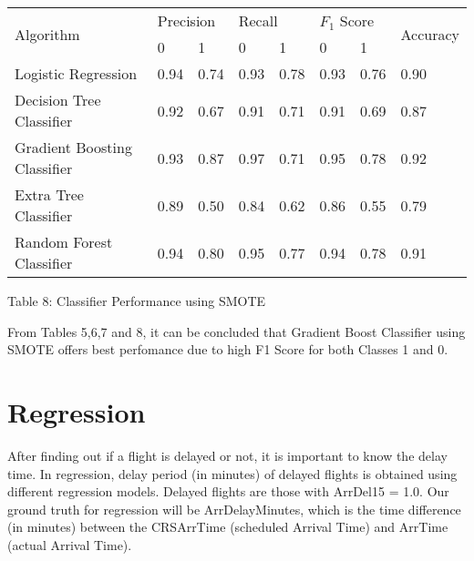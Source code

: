 \documentclass[12pt,letter-paper]{article}
\begin{document}
            \begin{table}[H]
        \begin{center}
            \begin{tabular}{|l|l|l|l|l|l|l|l|}
                \hline
                \multirow{2}{*}{Algorithm} & \multicolumn{2}{l|}{Precision} & \multicolumn{2}{l|}{Recall} & \multicolumn{2}{l|}{$F_1$ Score} & \multirow{2}{*}{Accuracy} \\ \cline{2-7}
                                   & 0              & 1             & 0            & 1            & 0             & 1             &                           \\ \hline
            Logistic Regression         & 0.94           & 0.74          & 0.93         & 0.78         & 0.93          & 0.76          & 0.90                     \\ \hline
            Decision Tree Classifier         & 0.92           & 0.67          & 0.91         & 0.71         & 0.91          & 0.69          & 0.87                      \\ \hline
            Gradient Boosting Classifier & 0.93           & 0.87          & 0.97         & 0.71         & 0.95          & 0.78          & 0.92                      \\ \hline
            Extra Tree Classifier       & 0.89           & 0.50          & 0.84         & 0.62         & 0.86          & 0.55          & 0.79                      \\ \hline
            Random Forest Classifier     & 0.94           & 0.80          & 0.95         & 0.77         & 0.94          & 0.78          & 0.91                      \\ \hline
            \end{tabular}
        \end{center}
        \begin{center}
        Table 8: Classifier Performance using SMOTE 
            \end{center}
        \end{table}
        
    From Tables 5,6,7 and 8, it can be concluded that Gradient Boost Classifier using SMOTE offers best perfomance due to high F1 Score for both Classes 1 and 0.
    
\section{Regression}

    After finding out if a flight is delayed or not, it is important to know the delay time. In regression, delay period (in minutes) of delayed flights is obtained using different regression models. Delayed flights are those with ArrDel15 = 1.0. Our ground truth for regression will be ArrDelayMinutes, which is the time difference (in minutes) between the CRSArrTime (scheduled Arrival Time) and ArrTime (actual Arrival Time).
    
\end{document}
